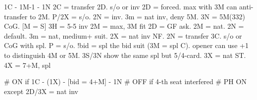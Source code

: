 1C - 1M-1 - 1N
2C = transfer 2D. s/o or inv
    2D = forced. max with 3M can anti-transfer to 2M.
        P/2X = s/o. 2N = inv. 3m = nat inv, deny 5M. 3N = 5M(332) CoG.
        [M = S] 3H = 5-5 inv
    2M = max, 3M fit
2D = GF ask.
    2M = nat. 2N = default. 3m = nat, medium+ suit.
2X = nat inv NF.
2N = transfer 3C. s/o or CoG with spl.
    P = s/o. 
    !bid = spl the bid suit (3M = spl C). opener can use +1 to distinguish 4M or 5M. 3S/3N show the same spl but 5/4-card.
3X = nat ST.
4X = 7+M, spl

# ON if 1C - (1X) - [bid = 4+M] - 1N
# OFF if 4-th seat interfered
# PH ON except 2D/3X = nat inv